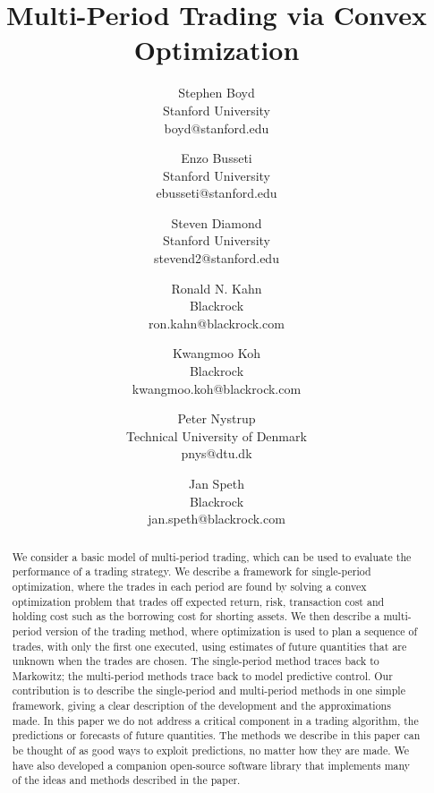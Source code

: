 \documentclass[openany]{now}
\begin{document}
\title{Multi-Period Trading via Convex Optimization}

\author{
Stephen Boyd \\
Stanford University \\
boyd@stanford.edu
\and
Enzo Busseti \\
Stanford University \\
ebusseti@stanford.edu
\and
Steven Diamond \\
Stanford University \\
stevend2@stanford.edu
\and
Ronald N. Kahn \\
Blackrock \\
ron.kahn@blackrock.com
\and
Kwangmoo Koh \\
Blackrock \\
kwangmoo.koh@blackrock.com
\and
Peter Nystrup \\
Technical University of Denmark \\
pnys@dtu.dk
\and
Jan Speth \\
Blackrock \\
jan.speth@blackrock.com
}

\frontmatter

\maketitle

\tableofcontents

\mainmatter

\begin{abstract}
We consider a basic model of multi-period trading, which can
be used to evaluate the performance of a trading strategy.
We describe a framework for single-period optimization,
where the trades in each period are found by solving a
convex optimization problem that trades off expected return,
risk, transaction cost and holding cost such as the
borrowing cost for shorting assets.
We then describe a multi-period version of the trading
method, where optimization is used to plan a sequence of
trades, with only the first one executed, using estimates
of future quantities that are unknown when the trades
are chosen.
The single-period method traces back to Markowitz;
the multi-period methods trace back to model predictive control.
\nocite{bemporad2006model,mattingley2011receding}
Our contribution is to describe the single-period and
multi-period methods in one simple framework, giving a clear
description of the development and the approximations made.
In this paper we do not address a critical component in
a trading algorithm, the predictions or forecasts
of future quantities.
The methods we describe in this paper can be thought of as
good ways to exploit predictions, no matter how they are made.
We have also developed a companion open-source software library
that implements many of the ideas and methods described in
the paper.
\end{abstract}
\end{document}
